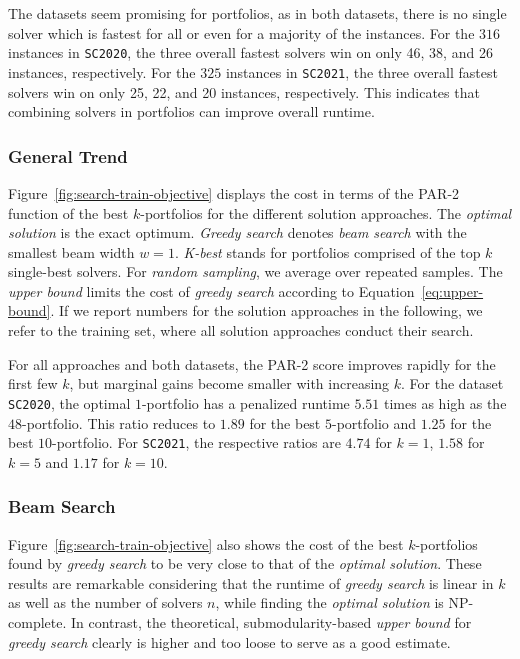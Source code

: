 \documentclass[conference]{IEEEtran}
\begin{document}
The datasets seem promising for portfolios, as in both datasets, there is no single solver which is fastest for all or even for a majority of the instances.
For the $316$ instances in \texttt{SC2020}, the three overall fastest solvers win on only 46, 38, and 26 instances, respectively.
For the $325$ instances in \texttt{SC2021}, the three overall fastest solvers win on only 25, 22, and 20 instances, respectively.
This indicates that combining solvers in portfolios can improve overall runtime.

\subsubsection{General Trend}

Figure~\ref{fig:search-train-objective} displays the cost in terms of the PAR-2 function of the best $k$-portfolios for the different solution approaches. 
The \emph{optimal solution} is the exact optimum.
\emph{Greedy search} denotes \emph{beam search} with the smallest beam width $w=1$. 
\emph{K-best} stands for portfolios comprised of the top $k$ single-best solvers. 
For \emph{random sampling}, we average over repeated samples.
The \emph{upper bound} limits the cost of \emph{greedy search} according to Equation~\ref{eq:upper-bound}.
If we report numbers for the solution approaches in the following, we refer to the training set, where all solution approaches conduct their search.

For all approaches and both datasets, the PAR-2 score improves rapidly for the first few $k$, but marginal gains become smaller with increasing $k$.
For the dataset \texttt{SC2020}, the optimal $1$-portfolio has a penalized runtime $5.51$ times as high as the $48$-portfolio.
This ratio reduces to $1.89$ for the best $5$-portfolio and $1.25$ for the best $10$-portfolio.
For \texttt{SC2021}, the respective ratios are $4.74$ for $k=1$, $1.58$ for $k=5$ and $1.17$ for $k=10$.

\subsubsection{Beam Search}

Figure~\ref{fig:search-train-objective} also shows the cost of the best $k$-portfolios found by \emph{greedy search} to be very close to that of the \emph{optimal solution}.
These results are remarkable considering that the runtime of \emph{greedy search} is linear in $k$ as well as the number of solvers $n$, while finding the \emph{optimal solution} is NP-complete.
In contrast, the theoretical, submodularity-based \emph{upper bound} for \emph{greedy search} clearly is higher and too loose to serve as a good estimate.
\end{document}
